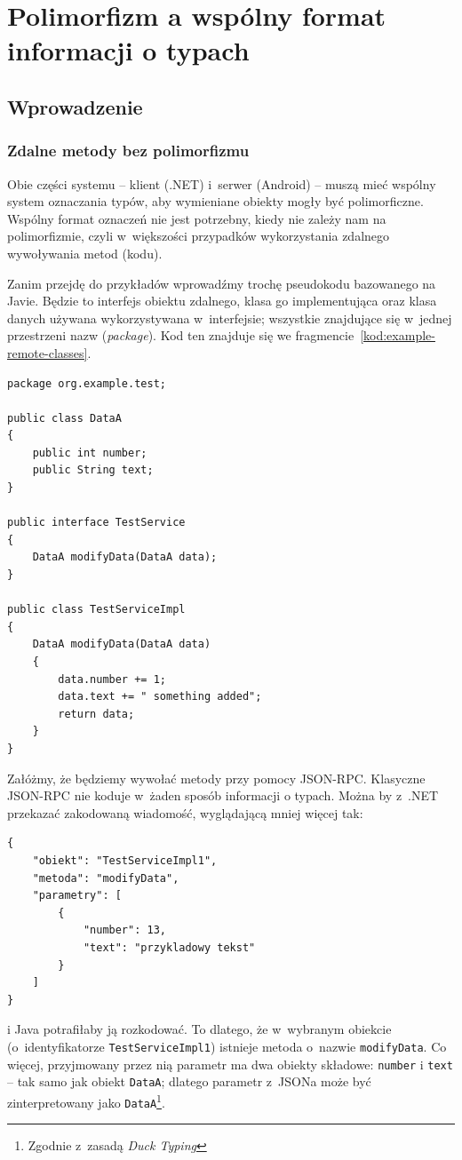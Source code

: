 \section{Polimorfizm a wspólny format informacji o typach}

\subsection{Wprowadzenie}

\subsubsection{Zdalne metody bez polimorfizmu}
Obie części systemu -- klient (.NET) i~serwer (Android) -- muszą mieć wspólny system oznaczania typów, aby wymieniane obiekty mogły być polimorficzne. 
Wspólny format oznaczeń nie jest potrzebny, kiedy nie zależy nam na polimorfizmie, czyli w~większości przypadków wykorzystania zdalnego wywoływania metod (kodu).

Zanim przejdę do przykładów wprowadźmy trochę pseudokodu bazowanego na Javie. Będzie to interfejs obiektu zdalnego, klasa go implementująca oraz klasa danych używana wykorzystywana w~interfejsie; wszystkie znajdujące się w~jednej przestrzeni nazw (\emph{package}). Kod ten znajduje się we fragmencie~\ref{kod:example-remote-classes}.

\begin{lstlisting}[float, frame=single, caption={Przykładowy kod metody zdalnej.}, label=kod:example-remote-classes]
package org.example.test;

public class DataA
{
    public int number;
    public String text;
}

public interface TestService
{        
    DataA modifyData(DataA data);
}

public class TestServiceImpl
{
    DataA modifyData(DataA data)
    {
        data.number += 1;
        data.text += " something added";
        return data;
    }
}
\end{lstlisting}

Załóżmy, że będziemy wywołać metody przy pomocy JSON-RPC. Klasyczne JSON-RPC nie koduje w~żaden sposób informacji o typach. Można by z~.NET przekazać zakodowaną wiadomość, wyglądającą mniej więcej tak:
\begin{lstlisting}[frame=single]
{
    "obiekt": "TestServiceImpl1",
    "metoda": "modifyData",
    "parametry": [
        {
            "number": 13,
            "text": "przykladowy tekst"
        }
    ]
}
\end{lstlisting}
i Java potrafiłaby ją rozkodować. To dlatego, że w~wybranym obiekcie (o~identyfikatorze \texttt{TestServiceImpl1}) istnieje metoda o~nazwie \texttt{modifyData}. Co więcej, przyjmowany przez nią parametr ma dwa obiekty składowe: \texttt{number} i \texttt{text} -- tak samo jak obiekt \texttt{DataA}; dlatego parametr z~JSONa może być zinterpretowany jako \texttt{DataA}\footnote{Zgodnie z~zasadą \emph{Duck Typing}}.

